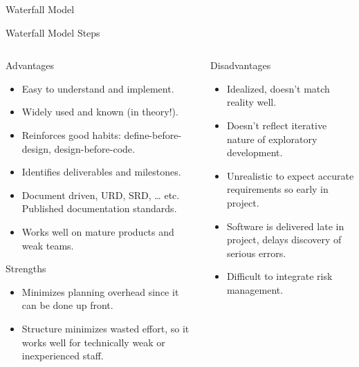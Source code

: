 \documentclass[final,hyperref={pdfpagelabels=false}]{beamer}
\begin{document}
\begin{frame}{ Waterfall Model}
\begin{block}{\large Waterfall Model Steps}
    \end{block}
    \vfill
    \begin{columns}[t]
      \begin{column}{.48\linewidth}
        \begin{block}{Advantages}
          \begin{itemize}
          \item Easy to understand and implement.
          \item Widely used and known (in theory!).
          \item Reinforces good habits: define-before- design,
                design-before-code.
          \item Identifies deliverables and milestones.
          \item Document driven, URD, SRD, … etc. Published
                documentation standards.
          \item Works well on mature products and weak teams.
          \end{itemize}
        \end{block}
        \vfill
        \begin{block}{Strengths}
          \begin{itemize}
          \item Minimizes planning
                overhead since it can
                be done up front.
          \item Structure minimizes
                wasted effort, so it
                works well for
                technically weak or
                inexperienced staff.
          \end{itemize}
        \end{block}
      \end{column}
      \begin{column}{.48\linewidth}
        \begin{block}{Disadvantages}
          \begin{itemize}
          \item Idealized, doesn't match reality well.
          \item Doesn't reflect iterative nature of exploratory
                development.
          \item Unrealistic to expect accurate requirements so
                early in project.
          \item Software is delivered late in project, delays discovery
                of serious errors.
          \item Difficult to integrate risk management.

\end{itemize}
\end{block}
\end{column}
\end{columns}
\end{frame}
\end{document}
